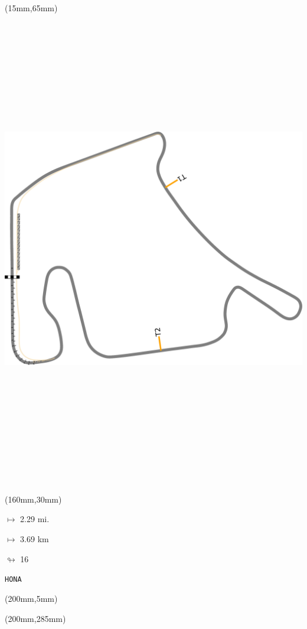 \begin{textblock*}{185mm}(15mm,65mm)%
\centering
\mbox{\includegraphics[width=185mm,height=210mm,keepaspectratio]{PT/HONA.pdf}}
\end{textblock*}
\begin{textblock*}{40mm}(160mm,30mm)%
\Large
\par$\mapsto$ 2.29 mi.
\par$\mapsto$ 3.69 km
\par$\looparrowright$ 16
\par\hfill\tiny\tt HONA\\
\end{textblock*}
\begin{textblock*}{20mm}(200mm,5mm)%
\fbox{\thepage}
\label{HONA}
\end{textblock*}
\begin{textblock*}{20mm}(200mm,285mm)%
\fbox{\thepage}
\end{textblock*}


